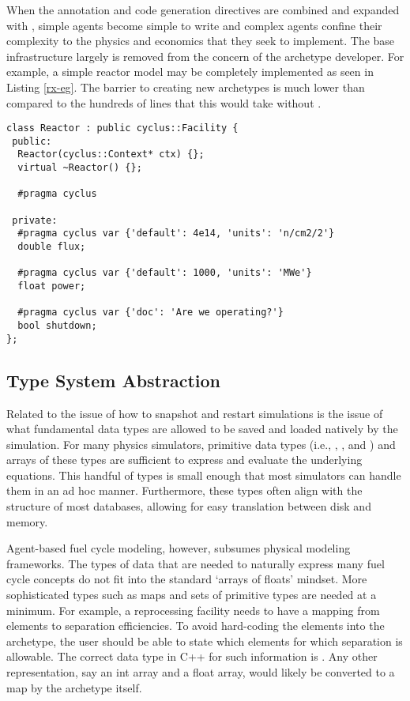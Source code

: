 When the annotation and code generation directives are combined and expanded with 
\cycpp, simple agents become simple to write and complex agents confine their 
complexity to the physics and economics that they seek to implement. The base \cyclus
infrastructure largely is removed from the concern of the archetype developer.
For example, a simple reactor model may be completely implemented as seen in 
Listing \ref{rx-eg}. The barrier to creating new archetypes is much lower than 
compared to the hundreds of lines that this would take without \cycpp.

\begin{lstlisting}[caption={Simple Reactor Archetype}, label=rx-eg]
class Reactor : public cyclus::Facility {
 public:
  Reactor(cyclus::Context* ctx) {};
  virtual ~Reactor() {};

  #pragma cyclus

 private:
  #pragma cyclus var {'default': 4e14, 'units': 'n/cm2/2'}
  double flux;

  #pragma cyclus var {'default': 1000, 'units': 'MWe'}
  float power;

  #pragma cyclus var {'doc': 'Are we operating?'}
  bool shutdown;
};
\end{lstlisting}

\subsection{Type System Abstraction}

Related to the issue of how to snapshot and restart simulations is the issue of 
what fundamental data types are allowed to be saved and loaded natively by the 
simulation. For many physics simulators, primitive data types (i.e., , 
, and ) and arrays of these types are sufficient to 
express and evaluate the underlying equations. This handful of types is small enough 
that most simulators can handle them in an ad hoc manner. Furthermore, these types
often align with the structure of most databases, allowing for easy translation
between disk and memory.

Agent-based fuel cycle modeling, however, subsumes physical modeling frameworks.
The types of data that are needed to naturally express many fuel cycle concepts 
do not fit into the standard `arrays of floats' mindset.  More sophisticated types
such as maps and sets of primitive types are needed at a minimum. For example, 
a reprocessing facility needs to have a mapping from elements to separation 
efficiencies. To avoid hard-coding the elements into the archetype, the user should 
be able to state which elements for which separation is allowable. The correct data
type in C++ for such information is . Any other 
representation, say an int array and a float array,  would likely be converted to 
a map by the archetype itself.


